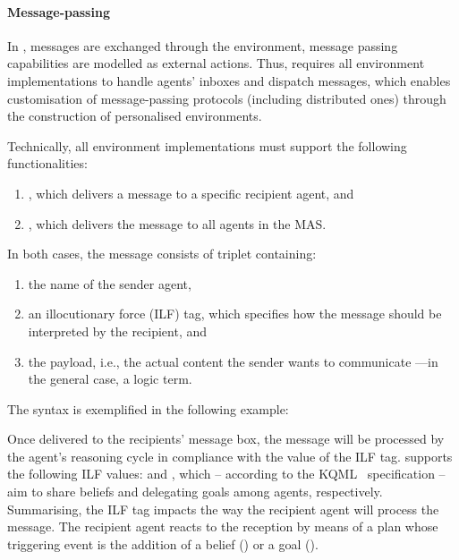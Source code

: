 \paragraph{Message-passing}

In \jakta{}, messages are exchanged through the environment,
message passing capabilities are modelled as external actions.
%
Thus, \jakta{} requires all environment implementations to handle
agents' inboxes and dispatch messages,
which enables customisation of message-passing protocols
(including distributed ones)
through the construction of personalised environments.
%

Technically, all environment implementations must support the following functionalities:
%
\begin{enumerate}
    \item {}, which delivers a message to a specific recipient agent,
    and
    \item {}, which delivers the message to all agents in the \ac{MAS}.
\end{enumerate}
%
In both cases, the message consists of triplet containing:
\begin{enumerate}
    \item the name of the sender agent,
    \item an illocutionary force (ILF) tag, which specifies how the message should be interpreted by the recipient,
    and
    \item the payload, i.e., the actual content the sender wants to communicate%
    ---in the general case, a logic term.
\end{enumerate}
%
The syntax is exemplified in the following example:
%

%
Once delivered to the recipients' message box,
the message will be processed by the agent's reasoning cycle in compliance with the value of the ILF tag.
%
\jakta{} supports the following ILF values:
 and ,
which -- according to the KQML~\cite{finin1994KQML} specification --
aim to share beliefs and delegating goals among agents, respectively.
%
Summarising, the ILF tag impacts the way the recipient agent will process the message.
%
The recipient agent reacts to
the reception by means of a plan whose triggering event is the addition of a belief
() or a goal ().

